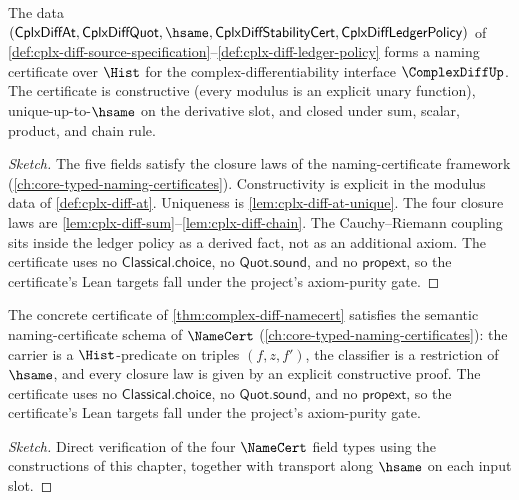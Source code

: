 \begin{theorem}
\label{thm:complex-diff-namecert}
The data \((\mathsf{CplxDiffAt}, \mathsf{CplxDiffQuot}, \hsame, \mathsf{CplxDiffStabilityCert}, \mathsf{CplxDiffLedgerPolicy})\) of \autoref{def:cplx-diff-source-specification}--\autoref{def:cplx-diff-ledger-policy} forms a naming certificate over \(\Hist\) for the complex-differentiability interface \(\ComplexDiffUp\). The certificate is constructive (every modulus is an explicit unary function), unique-up-to-\(\hsame\) on the derivative slot, and closed under sum, scalar, product, and chain rule.
\end{theorem}
\begin{proof}[Sketch]
The five fields satisfy the closure laws of the naming-certificate framework (\autoref{ch:core-typed-naming-certificates}). Constructivity is explicit in the modulus data of \autoref{def:cplx-diff-at}. Uniqueness is \autoref{lem:cplx-diff-at-unique}. The four closure laws are \autoref{lem:cplx-diff-sum}--\autoref{lem:cplx-diff-chain}. The Cauchy--Riemann coupling sits inside the ledger policy as a derived fact, not as an additional axiom. The certificate uses no \(\mathsf{Classical.choice}\), no \(\mathsf{Quot.sound}\), and no \(\mathsf{propext}\), so the certificate's Lean targets fall under the project's axiom-purity gate.
\end{proof}

\begin{theorem}
\label{thm:complex-diff-semantic-namecert}
The concrete certificate of \autoref{thm:complex-diff-namecert} satisfies the semantic naming-certificate schema of \(\NameCert\) (\autoref{ch:core-typed-naming-certificates}): the carrier is a \(\Hist\)-predicate on triples \((f, z, f')\), the classifier is a restriction of \(\hsame\), and every closure law is given by an explicit constructive proof. The certificate uses no \(\mathsf{Classical.choice}\), no \(\mathsf{Quot.sound}\), and no \(\mathsf{propext}\), so the certificate's Lean targets fall under the project's axiom-purity gate.
\end{theorem}
\begin{proof}[Sketch]
Direct verification of the four \(\NameCert\) field types using the constructions of this chapter, together with transport along \(\hsame\) on each input slot.
\end{proof}

